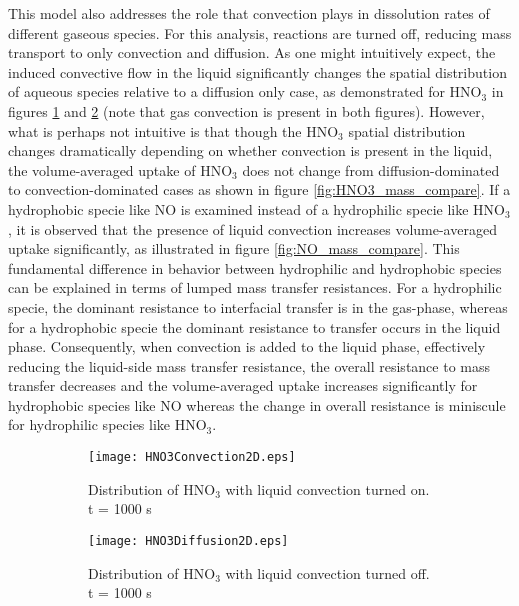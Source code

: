 This model also addresses the role that convection plays in dissolution rates of different gaseous species. For this analysis, reactions are turned off, reducing mass transport to only convection and diffusion. As one might intuitively expect, the induced convective flow in the liquid significantly changes the spatial distribution of aqueous species relative to a diffusion only case, as demonstrated for HNO$_3$ in figures \ref{fig:HNO3_convec} and \ref{fig:HNO3_diffus} (note that gas convection is present in both figures). However, what is perhaps not intuitive is that though the HNO$_3$ spatial distribution changes dramatically depending on whether convection is present in the liquid, the volume-averaged uptake of HNO$_3$ does not change from diffusion-dominated to convection-dominated cases as shown in figure \ref{fig:HNO3_mass_compare}. If a hydrophobic specie like NO is examined instead of a hydrophilic specie like HNO$_3$, it is observed that the presence of liquid convection increases volume-averaged uptake significantly, as illustrated in figure \ref{fig:NO_mass_compare}. This fundamental difference in behavior between hydrophilic and hydrophobic species can be explained in terms of lumped mass transfer resistances. For a hydrophilic specie, the dominant resistance to interfacial transfer is in the gas-phase, whereas for a hydrophobic specie the dominant resistance to transfer occurs in the liquid phase. \cite[p. 249]{carberry2001chemical} Consequently, when convection is added to the liquid phase, effectively reducing the liquid-side mass transfer resistance, the overall resistance to mass transfer decreases and the volume-averaged uptake increases significantly for hydrophobic species like NO whereas the change in overall resistance is miniscule for hydrophilic species like HNO$_3$.

\begin{figure}[htpb]
    \centering
    \begin{subfigure}[b]{.7\textwidth}
        \texttt{[image: HNO3Convection2D.eps]}
        \caption{Distribution of HNO$_3$ with liquid convection turned on. t = 1000 s}
        \label{fig:HNO3_convec}
    \end{subfigure}
    \begin{subfigure}[b]{.7\textwidth}
        \texttt{[image: HNO3Diffusion2D.eps]}
        \caption{Distribution of HNO$_3$ with liquid convection turned off. t = 1000 s}
        \label{fig:HNO3_diffus}
    \end{subfigure}
    \caption{}
    \label{fig:HNO3}
\end{figure}

